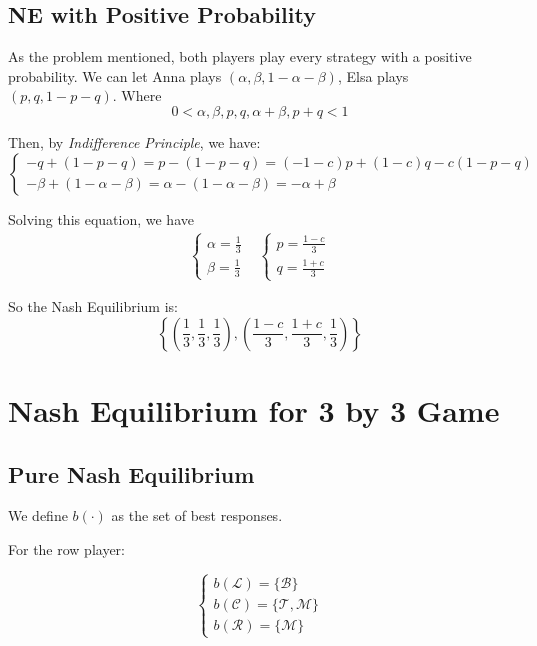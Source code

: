 \documentclass{article}
\begin{document}
    \subsection{NE with Positive Probability}

    As the problem mentioned, both players play every strategy with a positive probability. We can let Anna plays $(\alpha, \beta, 1-\alpha-\beta)$, Elsa plays $(p, q, 1-p-q)$. Where
    $$0<\alpha, \beta, p, q, \alpha+\beta, p+q<1$$

    Then, by \textit{Indifference Principle}, we have:
    $$
    \begin{cases}
        -q+(1-p-q)=p-(1-p-q)=(-1-c)p+(1-c)q-c(1-p-q)\\
        -\beta+(1-\alpha-\beta)=\alpha-(1-\alpha-\beta)=-\alpha+\beta
    \end{cases}
    $$

    Solving this equation, we have
    \begin{align*}
    \begin{cases}
        \alpha=\frac{1}{3}\\
        \beta=\frac{1}{3}
    \end{cases}&
    \begin{cases}
        p=\frac{1-c}{3}\\
        q=\frac{1+c}{3}
    \end{cases}
    \end{align*}

    So the Nash Equilibrium is:
    $$
    \left\{\left(\frac{1}{3}, \frac{1}{3}, \frac{1}{3}\right), \left(\frac{1-c}{3}, \frac{1+c}{3}, \frac{1}{3}\right)\right\}
    $$

    \section{Nash Equilibrium for 3 by 3 Game}

    \subsection{Pure Nash Equilibrium}

    We define $b(\cdot)$ as the set of best responses.

    For the row player:

    $$
    \begin{cases}
        b(\mathcal{L})=\{\mathcal{B}\}\\
        b(\mathcal{C})=\{\mathcal{T}, \mathcal{M}\}\\
        b(\mathcal{R})=\{\mathcal{M}\}
    \end{cases}
    $$
\end{document}
